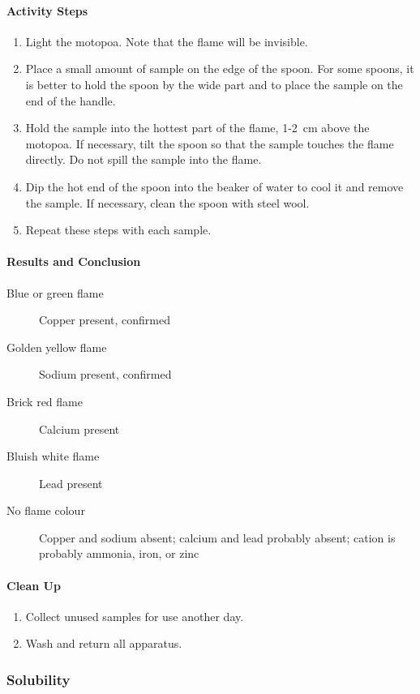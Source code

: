 \paragraph{Activity Steps}
\begin{enumerate}
\item{Light the motopoa. Note that the flame will be invisible.}
\item{Place a small amount of sample on the edge of the spoon. For some spoons, it is better to hold the spoon by the wide part and to place the sample on the end of the handle.}
\item{Hold the sample into the hottest part of the flame, 1-2~cm above the motopoa. If necessary, tilt the spoon so that the sample touches the flame directly. Do not spill the sample into the flame.}
\item{Dip the hot end of the spoon into the beaker of water to cool it and remove the sample. If necessary, clean the spoon with steel wool.}
\item{Repeat these steps with each sample.}
\end{enumerate}

\paragraph{Results and Conclusion}
\begin{description}
\item[Blue or green flame]{Copper present, confirmed}
\item[Golden yellow flame]{Sodium present, confirmed}
\item[Brick red flame]{Calcium present}
\item[Bluish white flame]{Lead present}
\item[No flame colour]{Copper and sodium absent; calcium and lead probably absent; cation is probably ammonia, iron, or zinc}
\end{description}

\paragraph{Clean Up}
\begin{enumerate}
\item{Collect unused samples for use another day.}
\item{Wash and return all apparatus.}
\end{enumerate}

\subsubsection{Solubility}

